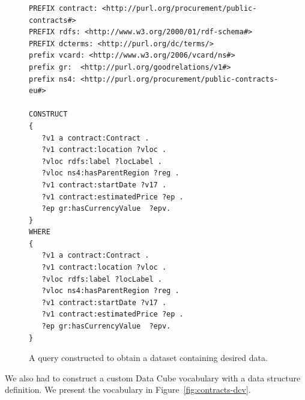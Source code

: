 \begin{figure}
  \scriptsize
  \begin{verbatim}
PREFIX contract: <http://purl.org/procurement/public-contracts#>
PREFIX rdfs: <http://www.w3.org/2000/01/rdf-schema#>
PREFIX dcterms: <http://purl.org/dc/terms/>
prefix vcard: <http://www.w3.org/2006/vcard/ns#> 
prefix gr:	<http://purl.org/goodrelations/v1#> 
prefix ns4:	<http://purl.org/procurement/public-contracts-eu#>

CONSTRUCT 
{
   ?v1 a contract:Contract .
   ?v1 contract:location ?vloc .
   ?vloc rdfs:label ?locLabel .
   ?vloc ns4:hasParentRegion ?reg .
   ?v1 contract:startDate ?v17 .
   ?v1 contract:estimatedPrice ?ep .
   ?ep gr:hasCurrencyValue	?epv.
}
WHERE
{
   ?v1 a contract:Contract .
   ?v1 contract:location ?vloc .
   ?vloc rdfs:label ?locLabel .
   ?vloc ns4:hasParentRegion ?reg .
   ?v1 contract:startDate ?v17 .
   ?v1 contract:estimatedPrice ?ep .
   ?ep gr:hasCurrencyValue	?epv.
}
  \end{verbatim}
  \caption{A query constructed to obtain a dataset containing desired data.}
  \label{fig:contracts-query}
\end{figure}

We also had to construct a custom Data Cube vocabulary with a data structure 
definition. We present the vocabulary in Figure~\ref{fig:contracts-dcv}.

